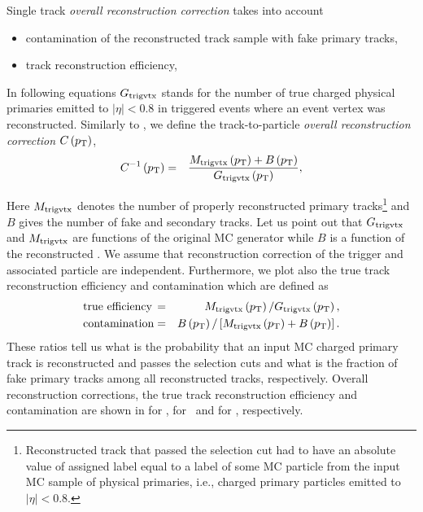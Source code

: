 \documentclass[ALICE,manyauthors]{ALICE_internal_notes}
\begin{document}
Single track \emph{overall reconstruction correction} takes into account
\begin{itemize}  
\item contamination of the reconstructed track sample with fake primary tracks,
\item track reconstruction efficiency,
\end{itemize}
In following equations $G_{\rm trigvtx}$ stands for the number of true charged physical primaries emitted to  $|\eta|<0.8$
in triggered events where an event vertex was reconstructed. 
Similarly to \cite{JFthesis}, we define the track-to-particle \emph{overall reconstruction correction} 
 $C\left(p_{\rm T}\right)$, 
\begin{eqnarray}
  C^{-1}\left( p_{\rm T} \right)&=& { M_{\rm trigvtx}\left(p_{\rm T}\right)+ B\left(p_{\rm T}\right) \over   G_{\rm trigvtx} \left(p_{\rm T}\right)},
 \label{eq:overallC}
\end{eqnarray}

Here $M_{\rm trigvtx}$ denotes the number of properly reconstructed primary tracks\footnote{ 
Reconstructed track that  passed the selection cut  had to have
 an absolute value of assigned label  equal to a label of some MC particle from the input
 MC sample of physical primaries, i.e., charged primary particles emitted to $|\eta|<0.8$.}
and $B$ gives the number of fake and secondary tracks. Let us point out that $G_{\rm trigvtx}$ and $M_{\rm trigvtx}$ are  functions 
of the original MC generator \pt{} while $B$ is a function of the reconstructed \pt{}.
We assume that reconstruction correction of the trigger and associated particle are independent.
Furthermore, we plot also the true track reconstruction efficiency and contamination which are defined as 
\begin{eqnarray}
  \mathrm{ true\,\, efficiency\,} &=&   M_{\rm trigvtx}\left(p_{\rm T}\right)/G_{\rm trigvtx} \left(p_{\rm T}\right), \\
  \mathrm{contamination} &=&  B\left(p_{\rm T}\right)/ \left[  M_{\rm trigvtx}\left(p_{\rm T}\right)+ B\left(p_{\rm T}\right) \right] .
  \label{eq:Cont}
\end{eqnarray}
These ratios tell us what is the probability that an input MC charged primary track is reconstructed  and passes the selection  cuts   and
  what is the fraction of fake  primary tracks among all reconstructed tracks, respectively. 
  Overall reconstruction corrections, the true track reconstruction efficiency and contamination are shown in  for \ppb,  for \pp {}\tev\ and  for \pp {}\tev, respectively.
 
\end{document}
